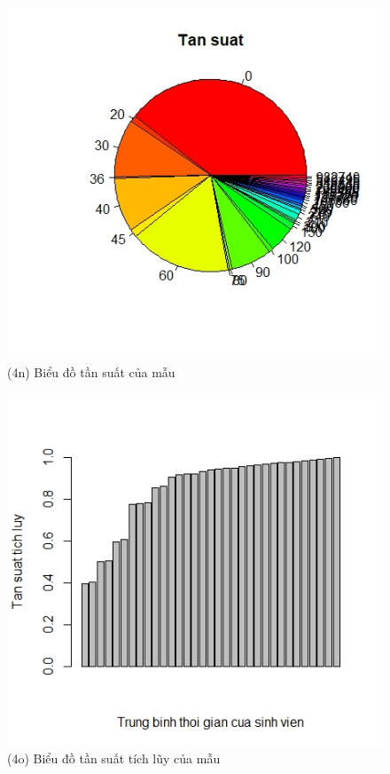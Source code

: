 \documentclass[a4paper]{article}
\theoremstyle{definition}
\begin{document}
\begin{figure}[!ht]
    \centering
    \includegraphics[scale=0.4]{Pics/q4n-file3.jpeg}
    \caption{(4n) Biểu đồ tần suất của mẫu}
    \label{fig:my_label}
\end{figure}
\newpage
\begin{figure}[!ht]
    \centering
    \includegraphics[scale=0.4]{Pics/q4o-file3.jpeg}
    \caption{(4o) Biểu đồ tần suất tích lũy của mẫu }
    \label{fig:my_label}
\end{figure}
\end{document}
